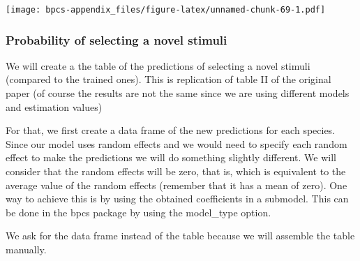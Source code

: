 \documentclass[
]{book}
\begin{document}
\texttt{[image: bpcs-appendix\_files/figure-latex/unnamed-chunk-69-1.pdf]}

\hypertarget{probability-of-selecting-a-novel-stimuli}{%
\subsubsection{Probability of selecting a novel stimuli}\label{probability-of-selecting-a-novel-stimuli}}

We will create a the table of the predictions of selecting a novel stimuli (compared to the trained ones). This is replication of table II of the original paper (of course the results are not the same since we are using different models and estimation values)

For that, we first create a data frame of the new predictions for each species. Since our model uses random effects and we would need to specify each random effect to make the predictions we will do something slightly different. We will consider that the random effects will be zero, that is, which is equivalent to the average value of the random effects (remember that it has a mean of zero). One way to achieve this is by using the obtained coefficients in a submodel. This can be done in the bpcs package by using the model\_type option.

We ask for the data frame instead of the table because we will assemble the table manually.
\end{document}
